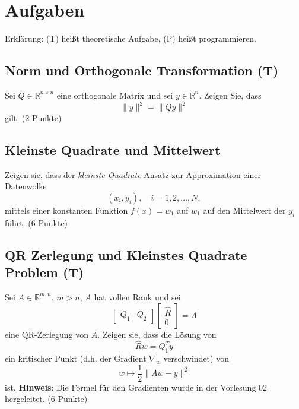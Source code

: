 \documentclass[]{book}
\theoremstyle{definition}
\theoremstyle{definition}
\theoremstyle{definition}
\theoremstyle{definition}
\theoremstyle{remark}
\begin{document}
\hypertarget{aufgaben-1}{%
\section{Aufgaben}\label{aufgaben-1}}

Erklärung: (T) heißt theoretische Aufgabe, (P) heißt programmieren.

\hypertarget{norm-und-orthogonale-transformation-t}{%
\subsection{Norm und Orthogonale Transformation (T)}\label{norm-und-orthogonale-transformation-t}}

Sei \(Q\in \mathbb R^{n\times n}\) eine orthogonale Matrix und sei \(y\in \mathbb R^{n}\). Zeigen Sie, dass
\begin{equation*}
\|y\|^2 = \|Qy \|^2
\end{equation*}
gilt. (2 Punkte)

\hypertarget{kleinste-quadrate-und-mittelwert}{%
\subsection{Kleinste Quadrate und Mittelwert}\label{kleinste-quadrate-und-mittelwert}}

Zeigen sie, dass der \emph{kleinste Quadrate} Ansatz zur Approximation einer Datenwolke
\begin{equation*}
(x_i, y_i), \quad i=1,2,\dotsc,N,
\end{equation*}
mittels einer konstanten Funktion \(f(x)=w_1\) auf \(w_1\) auf den Mittelwert der \(y_i\) führt. (6 Punkte)

\hypertarget{qr-zerlegung-und-kleinstes-quadrate-problem-t}{%
\subsection{QR Zerlegung und Kleinstes Quadrate Problem (T)}\label{qr-zerlegung-und-kleinstes-quadrate-problem-t}}

Sei \(A\in \mathbb R^{m,n}\), \(m>n\), \(A\) hat vollen Rank und sei
\begin{equation*}
\begin{bmatrix}
Q_1 & Q_2
\end{bmatrix}
\begin{bmatrix}
\hat R \\ 0
\end{bmatrix} = A
\end{equation*}
eine QR-Zerlegung von \(A\). Zeigen sie, dass die Lösung von
\begin{equation*}
\hat R w = Q_1^T y
\end{equation*}
ein kritischer Punkt (d.h. der Gradient \(\nabla_w\) verschwindet) von
\begin{equation*}
w \mapsto \frac 12 \| Aw - y \|^2
\end{equation*}
ist. \textbf{Hinweis}: Die Formel für den Gradienten wurde in der Vorlesung 02 hergeleitet. (6 Punkte)
\end{document}
